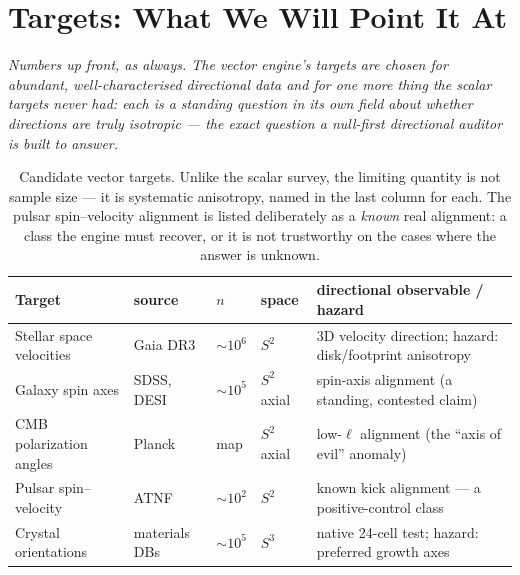 \documentclass[11pt, letterpaper, openany]{book}
\begin{document}
\chapter{Targets: What We Will Point It At}

\begin{center}
\textit{Numbers up front, as always. The vector engine's targets are chosen for abundant, well-characterised
directional data and for one more thing the scalar targets never had: each is a standing question in its own
field about whether directions are truly isotropic --- the exact question a null-first directional auditor is
built to answer.}
\end{center}

\begin{table}[H]
\centering
\small
\renewcommand{\arraystretch}{1.3}
\begin{tabular}{@{}p{3.0cm}p{2.3cm}p{1.4cm}p{2.0cm}p{4.0cm}@{}}
\toprule
\textbf{Target} & \textbf{source} & \textbf{$n$} & \textbf{space} & \textbf{directional observable / hazard} \\
\midrule
Stellar space velocities & Gaia DR3 & $\sim10^6$ & $S^2$ & 3D velocity direction; hazard: disk/footprint anisotropy \\
Galaxy spin axes & SDSS, DESI & $\sim10^5$ & $S^2$ axial & spin-axis alignment (a standing, contested claim) \\
CMB polarization angles & Planck & map & $S^2$ axial & low-$\ell$ alignment (the ``axis of evil'' anomaly) \\
Pulsar spin--velocity & ATNF & $\sim10^2$ & $S^2$ & known kick alignment --- a positive-control class \\
Crystal orientations & materials DBs & $\sim10^5$ & $S^3$ & native 24-cell test; hazard: preferred growth axes \\
\bottomrule
\end{tabular}
\caption{Candidate vector targets. Unlike the scalar survey, the limiting quantity is not sample size --- it
is systematic anisotropy, named in the last column for each. The pulsar spin--velocity alignment is listed
deliberately as a \emph{known} real alignment: a class the engine must recover, or it is not trustworthy on
the cases where the answer is unknown.}
\end{table}
\end{document}
